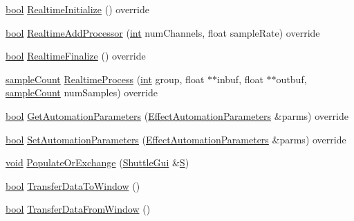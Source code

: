 \begin{DoxyCompactItemize}
\item 
\hyperlink{mac_2config_2i386_2lib-src_2libsoxr_2soxr-config_8h_abb452686968e48b67397da5f97445f5b}{bool} \hyperlink{class_effect_phaser_a0a96da003733656a210e00cb49a98c8f}{Realtime\+Initialize} () override
\item 
\hyperlink{mac_2config_2i386_2lib-src_2libsoxr_2soxr-config_8h_abb452686968e48b67397da5f97445f5b}{bool} \hyperlink{class_effect_phaser_aa570e9e4ce13a75fb7da049a06c010ff}{Realtime\+Add\+Processor} (\hyperlink{xmltok_8h_a5a0d4a5641ce434f1d23533f2b2e6653}{int} num\+Channels, float sample\+Rate) override
\item 
\hyperlink{mac_2config_2i386_2lib-src_2libsoxr_2soxr-config_8h_abb452686968e48b67397da5f97445f5b}{bool} \hyperlink{class_effect_phaser_a7fb3d5d05a868bc41c3ce8848469a5d1}{Realtime\+Finalize} () override
\item 
\hyperlink{include_2audacity_2_types_8h_afa427e1f521ea5ec12d054e8bd4d0f71}{sample\+Count} \hyperlink{class_effect_phaser_a1c0834024939195d73f2e7e0d31a8a65}{Realtime\+Process} (\hyperlink{xmltok_8h_a5a0d4a5641ce434f1d23533f2b2e6653}{int} group, float $\ast$$\ast$inbuf, float $\ast$$\ast$outbuf, \hyperlink{include_2audacity_2_types_8h_afa427e1f521ea5ec12d054e8bd4d0f71}{sample\+Count} num\+Samples) override
\item 
\hyperlink{mac_2config_2i386_2lib-src_2libsoxr_2soxr-config_8h_abb452686968e48b67397da5f97445f5b}{bool} \hyperlink{class_effect_phaser_a5c0eb699c07c1c3f90769845445928fa}{Get\+Automation\+Parameters} (\hyperlink{class_effect_automation_parameters}{Effect\+Automation\+Parameters} \&parms) override
\item 
\hyperlink{mac_2config_2i386_2lib-src_2libsoxr_2soxr-config_8h_abb452686968e48b67397da5f97445f5b}{bool} \hyperlink{class_effect_phaser_a1b734a27bfc41e18afb0c943cb911d46}{Set\+Automation\+Parameters} (\hyperlink{class_effect_automation_parameters}{Effect\+Automation\+Parameters} \&parms) override
\item 
\hyperlink{sound_8c_ae35f5844602719cf66324f4de2a658b3}{void} \hyperlink{class_effect_phaser_af34f2c6ec802450e70bc254d4d0ad4e6}{Populate\+Or\+Exchange} (\hyperlink{class_shuttle_gui}{Shuttle\+Gui} \&\hyperlink{xlftab_8c_af933676109efed7ab34cea71d748a517}{S})
\item 
\hyperlink{mac_2config_2i386_2lib-src_2libsoxr_2soxr-config_8h_abb452686968e48b67397da5f97445f5b}{bool} \hyperlink{class_effect_phaser_ae21de3ca3c493dc9fa2dbe8a07dab1cb}{Transfer\+Data\+To\+Window} ()
\item 
\hyperlink{mac_2config_2i386_2lib-src_2libsoxr_2soxr-config_8h_abb452686968e48b67397da5f97445f5b}{bool} \hyperlink{class_effect_phaser_a58c9054c6ec3229c1c7e4fc38ef966bb}{Transfer\+Data\+From\+Window} ()
\end{DoxyCompactItemize}
